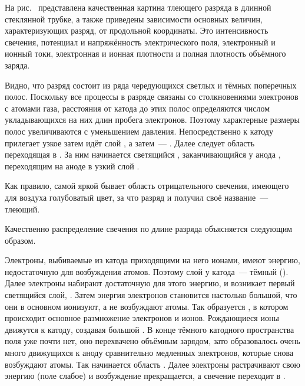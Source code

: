 На рис.~ представлена качественная картина тлеющего
разряда в длинной стеклянной трубке, а также приведены зависимости
основных величин, характеризующих разряд, от продольной координаты. Это
интенсивность свечения, потенциал и
напряжённость электрического поля, электронный и ионный токи, электронная и
ионная плотности и полная плотность
объёмного заряда.

Видно, что разряд состоит из ряда чередующихся светлых и тёмных поперечных
полос. Поскольку все процессы в разряде
связаны со столкновениями электронов с атомами газа, расстояния от катода до
этих полос определяются числом
укладывающихся на них длин пробега электронов. Поэтому характерные размеры полос
увеличиваются с уменьшением давления.
Непосредственно к катоду прилегает узкое 
затем идёт слой , а
затем~--- . Далее следует область
 переходящая в
. За ним начинается светящийся
, заканчивающийся у анода
, переходящим на аноде в узкий слой
.

Как правило, самой яркой бывает область отрицательного свечения, имеющего для
воздуха голубоватый цвет, за что разряд и
получил своё название~--- тлеющий.

Качественно распределение свечения по длине разряда объясняется следующим
образом.

Электроны, выбиваемые из катода приходящими на него ионами, имеют энергию,
недостаточную для возбуждения атомов. Поэтому
слой у катода~--- тёмный (). Далее электроны
набирают достаточную для этого энергию, и
возникает первый светящийся слой, . Затем энергия
электронов становится настолько большой, что
они в основном ионизуют, а не возбуждают атомы. Так образуется , в котором происходит
основное размножение электронов и ионов. Рождающиеся ионы движутся к катоду,
создавая большой . В конце тёмного катодного пространства поля уже почти нет, оно
перехвачено объёмным зарядом, зато
образовалось очень много движущихся к аноду сравнительно медленных электронов,
которые снова возбуждают атомы. Так
начинается область . Далее электроны
растрачивают свою энергию (поле слабое) и возбуждение
прекращается, а свечение переходит в .

